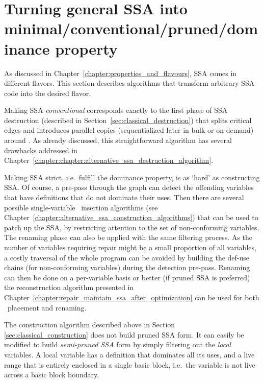 \section{Turning general SSA into minimal/conventional/pruned/dominance property}

As discussed in Chapter~\ref{chapter:properties_and_flavours},
SSA comes in different flavors. 
This section describes algorithms that transform
arbitrary SSA code
into the desired flavor.

Making SSA \textit{conventional} corresponds exactly to the first phase of SSA destruction (described in Section~\ref{sec:classical_destruction}) that splits critical edges and introduces parallel copies (sequentialized later in bulk or on-demand) around \phiops. As already discussed, this straightforward algorithm has several drawbacks addressed in Chapter~\ref{chapter:chapter:alternative_ssa_destruction_algorithm}.

Making SSA strict, i.e.\ fulfill the dominance property, is as `hard' as constructing SSA. Of course, a pre-pass through the graph can detect the offending variables that have definitions that do not dominate their uses. Then there are several possible single-variable \phiop\ insertion algorithms (see Chapter~\ref{chapter:alternative_ssa_construction_algorithms}) that can be used to patch up the SSA, by restricting attention to the set of non-conforming variables. The renaming phase can also be applied with the same filtering process. As the number of variables requiring repair might be a small proportion of all variables, a costly traversal of the whole program can be avoided by building the def-use chains (for non-conforming variables) during the detection pre-pass. Renaming can then be done on a per-variable basis or better (if pruned SSA is preferred) the reconstruction algorithm presented in Chapter~\ref{chapter:repair_maintain_ssa_after_optimization} can be used for both \phiops\ placement and renaming.

The construction algorithm described above in
Section \ref{sec:classical_construction} does not
build pruned SSA form. It can easily be modified to 
build \textit{semi-pruned SSA} form by simply filtering out the \emph{local} variables.
A local variable has a definition that dominates all its uses, and a 
live range that is entirely enclosed in a single basic block, i.e.\ the variable is not live across a basic block boundary.

